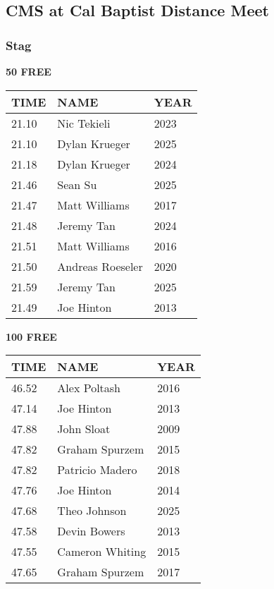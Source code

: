 
\newpage

\subsection{CMS at Cal Baptist Distance Meet}
\subsubsection{Stag}

\begin{table}[H]
\centering
\begin{minipage}[t]{0.48\textwidth}
\centering
\textbf{50 FREE}\\[0.1cm]
\begin{tabular}{@{}p{1.8cm}p{2.8cm}p{1.2cm}@{}}
\hline
    \textbf{TIME} & \textbf{NAME} & \textbf{YEAR} \\
\hline
    21.10 & Nic Tekieli & 2023 \\
    21.10 & Dylan Krueger & 2025 \\
    21.18 & Dylan Krueger & 2024 \\
    21.46 & Sean Su & 2025 \\
    21.47 & Matt Williams & 2017 \\
    21.48 & Jeremy Tan & 2024 \\
    21.51 & Matt Williams & 2016 \\
    21.50 & Andreas Roeseler & 2020 \\
    21.59 & Jeremy Tan & 2025 \\
    21.49 & Joe Hinton & 2013 \\
\hline
\end{tabular}
\end{minipage}\hfill
\begin{minipage}[t]{0.48\textwidth}
\centering
\textbf{100 FREE}\\[0.1cm]
\begin{tabular}{@{}p{1.8cm}p{2.8cm}p{1.2cm}@{}}
\hline
    \textbf{TIME} & \textbf{NAME} & \textbf{YEAR} \\
\hline
    46.52 & Alex Poltash & 2016 \\
    47.14 & Joe Hinton & 2013 \\
    47.88 & John Sloat & 2009 \\
    47.82 & Graham Spurzem & 2015 \\
    47.82 & Patricio Madero & 2018 \\
    47.76 & Joe Hinton & 2014 \\
    47.68 & Theo Johnson & 2025 \\
    47.58 & Devin Bowers & 2013 \\
    47.55 & Cameron Whiting & 2015 \\
    47.65 & Graham Spurzem & 2017 \\
\hline
\end{tabular}
\end{minipage}
\end{table}

